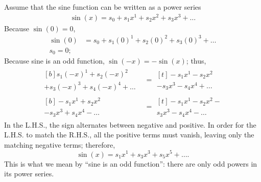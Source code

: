 Assume that the sine function can be written as a power series
\begin{align}
  \sin(x) = s_0 + s_1x^1 + s_2x^2 + s_3x^3 + \dots
\end{align}
Because \(\sin(0) = 0\),
\begin{align}
  \sin(0) & = s_0 + s_1(0)^1 + s_2(0)^2 + s_3(0)^3 + \dots \\
  s_0 = 0;
\end{align}
Because sine is an odd function, \(\sin(-x) = -\sin(x)\); thus,
\begin{align}
  \begin{multlined}[b]
    s_1(-x)^1 + s_2(-x)^2 \\
    + s_3(-x)^3 + s_4(-x)^4 + \dots
  \end{multlined} & =
  \begin{multlined}[t]
    -s_1x^1 - s_2x^2 \\
    - s_3x^3 - s_4x^4 + \dots
  \end{multlined}       \\
  \begin{multlined}[b]
    -s_1x^1 + s_2x^2 \\
    - s_3x^3 + s_4x^4 - \dots
  \end{multlined}       & =
  \begin{multlined}[t]
    -s_1x^1 - s_2x^2 - \\
    s_3x^3 - s_4x^4 - \dots
  \end{multlined}
\end{align}
In the L.H.S., the sign alternates between negative and positive. In order for the L.H.S. to match the R.H.S., all the positive terms must vanish, leaving only the matching negative terms; therefore,
\begin{equation}
  \sin(x) = s_1x^1 + s_3x^3 + s_5x^5 + \dots.
\end{equation}
This is what we mean by \enquote{sine is an odd function}: there are only odd powers in its power series.

